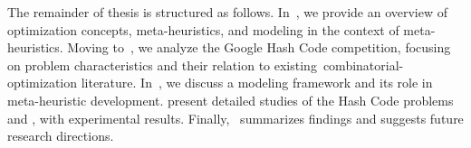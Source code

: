 The remainder of thesis is structured as follows. In~, we
provide an overview of optimization concepts, meta-heuristics, and modeling in
the context of meta-heuristics. Moving to~, we
analyze the Google Hash Code competition, focusing on problem characteristics
and their relation to existing~\acrshort{combinatorial-optimization} literature.
In~, we discuss a modeling framework and
its role in meta-heuristic development.
 present detailed
studies of the Hash Code problems  and
, with experimental results.
Finally,~ summarizes findings and suggests future research
directions.